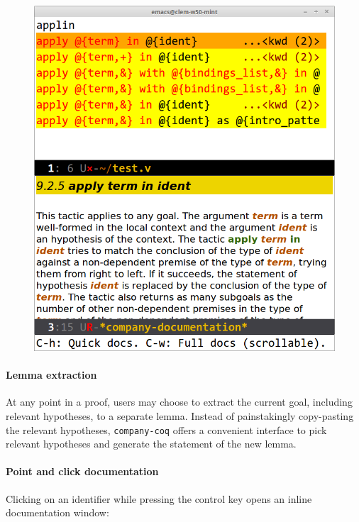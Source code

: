 \documentclass[preprint]{sigplanconf}
\begin{document}
\begin{figure}[H]
  \centering
  \includegraphics[width=\linewidth]{docs-xxl.png}
\end{figure}

\paragraph{Lemma extraction} At any point in a proof, users may choose to extract the current goal, including relevant hypotheses, to a separate lemma. Instead of painstakingly copy-pasting the relevant hypotheses, \texttt{company-coq} offers a convenient interface to pick relevant hypotheses and generate the statement of the new lemma.

\paragraph{Point and click documentation} Clicking on an identifier while pressing the control key opens an inline documentation window:
\end{document}
